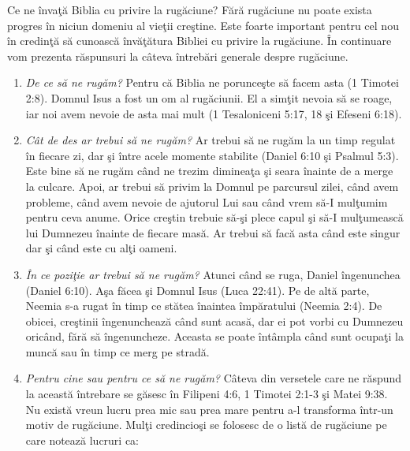 \newpage


Ce ne învaţă Biblia cu privire la rugăciune? Fără rugăciune nu poate exista progres în niciun domeniu al  vieţii creştine. Este foarte important pentru cel nou în credinţă să cunoască învăţătura Bibliei cu privire la rugăciune. În continuare vom prezenta răspunsuri la câteva întrebări generale despre rugăciune.

\begin{enumerate}

	\item \textit{De ce să ne rugăm?} Pentru că Biblia ne porunceşte să facem asta (1 Timotei 2:8). Domnul Isus a fost un om al rugăciunii. El a simţit nevoia să se roage, iar noi avem nevoie de asta mai mult (1 Tesaloniceni 5:17, 18 şi Efeseni 6:18). 
	
	\item \textit{Cât de des ar trebui să ne rugăm?} Ar trebui să ne rugăm la un timp regulat în fiecare zi, dar şi între acele momente stabilite (Daniel 6:10 şi Psalmul 5:3). Este bine să ne rugăm când ne trezim dimineaţa şi seara înainte de a merge la culcare. Apoi, ar trebui să privim la Domnul pe parcursul zilei, când avem probleme, când avem nevoie de ajutorul Lui sau când vrem să-I mulţumim pentru ceva anume. Orice creştin trebuie să-şi plece capul şi să-I mulţumească lui Dumnezeu înainte de fiecare masă. Ar trebui să facă asta când este singur dar şi când este cu alţi oameni.
	
	\item \textit{În ce poziţie ar trebui să ne rugăm?} Atunci când se ruga, Daniel îngenunchea (Daniel 6:10). Aşa făcea şi Domnul Isus (Luca 22:41). Pe de altă parte, Neemia s-a rugat în timp ce stătea înaintea împăratului (Neemia 2:4). De obicei, creştinii îngenunchează când sunt acasă, dar ei pot vorbi cu Dumnezeu oricând, fără să îngenuncheze. Aceasta se poate întâmpla când sunt ocupaţi la muncă sau în timp ce merg pe stradă. 
	
	\item \textit{Pentru cine sau pentru ce să ne rugăm?} Câteva din versetele care ne răspund la această întrebare se găsesc în Filipeni 4:6, 1 Timotei 2:1-3 şi Matei 9:38. Nu există vreun lucru prea mic sau prea mare pentru a-l transforma într-un motiv de rugăciune. Mulţi credincioşi se folosesc de o listă de rugăciune pe care notează lucruri ca:
	
	\begin{enumerate}


\end{enumerate}
\end{enumerate}
